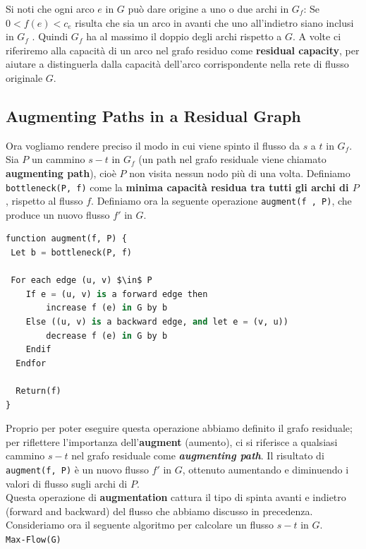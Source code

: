 Si noti che ogni arco $e$ in $G$ può dare origine a uno o due archi
in $G_f$: Se $0 < f (e) < c_e$ risulta che sia un arco in avanti
che uno all'indietro siano inclusi in $G_f$ . Quindi $G_f$ ha al
massimo il doppio degli archi rispetto a $G$. A volte ci riferiremo
alla capacità di un arco nel grafo residuo come \textbf{residual
	capacity}, per aiutare a distinguerla dalla capacità dell'arco
corrispondente nella rete di flusso originale $G$.


\subsection{Augmenting Paths in a Residual Graph}

Ora vogliamo rendere preciso il modo in cui viene spinto il flusso da
$s$ a $t$ in $G_f$. Sia $P$ un cammino $s-t$ in $G_f$ (un
path nel grafo residuale viene chiamato \textbf{augmenting path}), cioè
$P$ non visita nessun nodo più di una volta. Definiamo
\texttt{bottleneck(P,\ f)} come la \textbf{minima capacità residua tra
	tutti gli archi di $P$}, rispetto al flusso $f$. Definiamo ora la
seguente operazione \texttt{augment(f\ ,\ P)}, che produce un nuovo
flusso $f'$ in $G$.

\begin{lstlisting}[language=Python, mathescape=true]
function augment(f, P) {
 Let b = bottleneck(P, f)

 For each edge (u, v) $\in$ P
    If e = (u, v) is a forward edge then
    	increase f (e) in G by b
  	Else ((u, v) is a backward edge, and let e = (v, u))
    	decrease f (e) in G by b
  	Endif
  Endfor

  Return(f)
}
\end{lstlisting}

Proprio per poter eseguire questa operazione abbiamo deﬁnito il grafo
residuale; per riflettere l'importanza dell'\textbf{augment} (aumento),
ci si riferisce a qualsiasi cammino $s-t$ nel grafo residuale come
\textbf{\emph{augmenting path}}. Il risultato di
\texttt{augment(f,\ P)} è un nuovo flusso $f'$ in $G$, ottenuto
aumentando e diminuendo i valori di flusso sugli archi di $P$.\\

Questa operazione di \textbf{augmentation} cattura il tipo di spinta
avanti e indietro (forward and backward) del flusso che abbiamo discusso
in precedenza. Consideriamo ora il seguente algoritmo per calcolare un
flusso $s-t$ in $G$.\\

\texttt{Max-Flow(G)}

